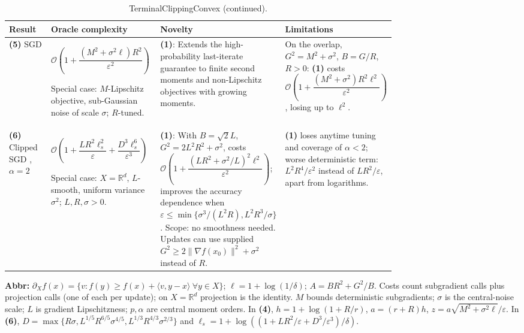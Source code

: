 \begin{table}[tp]
\centering
\caption{TerminalClippingConvex (continued).}
\begin{threeparttable}
\footnotesize
\setlength{\tabcolsep}{4pt}\renewcommand{\arraystretch}{1.25}
\begin{tabularx}{\linewidth}{@{}>{\raggedright\arraybackslash}p{0.20\linewidth}>{\raggedright\arraybackslash}p{0.32\linewidth}>{\raggedright\arraybackslash}p{0.23\linewidth}>{\raggedright\arraybackslash}X@{}}
\toprule
\textbf{Result} & \textbf{Oracle complexity} & \textbf{Novelty} & \textbf{Limitations} \\
\midrule
\textbf{(5)} SGD \citep[Thm.~3.5]{tcLZ2026v4}
& $\mathcal{O}\!\left(1+\dfrac{(M^2+\sigma^2\ell)R^2}{\varepsilon^2}\right)$\par Special case: $M$-Lipschitz objective, sub-Gaussian noise of scale $\sigma$; $R$-tuned.
& \textbf{(1)}: Extends the high-probability last-iterate guarantee to finite second moments and non-Lipschitz objectives with growing moments.
& On the overlap, $G^2=M^2+\sigma^2$, $B=G/R$, $R>0$: \textbf{(1)} costs $\mathcal{O}\!\left(1+\dfrac{(M^2+\sigma^2)R^2\ell^2}{\varepsilon^2}\right)$, losing up to $\ell^2$. \\
\midrule
\textbf{(6)} Clipped SGD \citep[Thm.~1, Cor.~1]{tcCPPG2026}, $\alpha=2$
& $\mathcal{O}\!\left(1+\dfrac{LR^2\ell_s^2}{\varepsilon}+\dfrac{D^3\ell_s^6}{\varepsilon^3}\right)$\par Special case: $X=\mathbb R^d$, $L$-smooth, uniform variance $\sigma^2$; $L,R,\sigma>0$.
& \textbf{(1)}: With $B=\sqrt2L$, $G^2=2L^2R^2+\sigma^2$, costs $\mathcal{O}\!\left(1+\dfrac{(LR^2+\sigma^2/L)^2\ell^2}{\varepsilon^2}\right)$; improves the accuracy dependence when $\varepsilon\le\min\{\sigma^3/(L^2R),L^2R^3/\sigma\}$. Scope: no smoothness needed. Updates can use supplied $G^2\ge2\|\nabla f(x_0)\|^2+\sigma^2$ instead of $R$.
& \textbf{(1)} loses anytime tuning and coverage of $\alpha<2$; worse deterministic term: $L^2R^4/\varepsilon^2$ instead of $LR^2/\varepsilon$, apart from logarithms. \\
\bottomrule
\end{tabularx}
\begin{tablenotes}[flushleft]\footnotesize
\item[] \textbf{Abbr:} $\partial_X f(x)=\{v:f(y)\ge f(x)+\langle v,y-x\rangle\ \forall y\in X\}$; $\ell=1+\log(1/\delta)$; $A=BR^2+G^2/B$. Costs count subgradient calls plus projection calls (one of each per update); on $X=\mathbb R^d$ projection is the identity. $M$ bounds deterministic subgradients; $\sigma$ is the central-noise scale; $L$ is gradient Lipschitzness; $p,\alpha$ are central moment orders. In \textbf{(4)}, $h=1+\log(1+R/r)$, $a=(r+R)h$, $z=a\sqrt{M^2+\sigma^2\ell}/\varepsilon$. In \textbf{(6)}, $D=\max\{R\sigma,L^{1/5}R^{6/5}\sigma^{4/5},L^{1/3}R^{4/3}\sigma^{2/3}\}$ and $\ell_s=1+\log((1+LR^2/\varepsilon+D^3/\varepsilon^3)/\delta)$.
\end{tablenotes}
\end{threeparttable}
\end{table}
\clearpage
